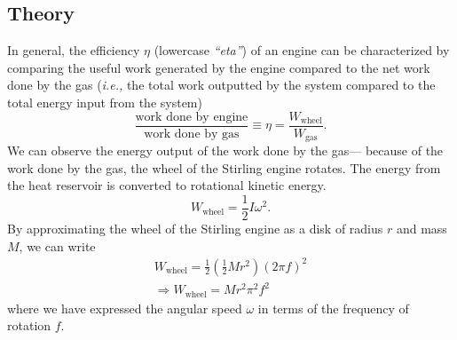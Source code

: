 \documentclass{article}
\begin{document}
\subsection{Theory}
In general, the efficiency $\eta$ (lowercase \textit{``eta''}) of an engine can be characterized by comparing the useful work generated by the engine compared to the net work done by the gas (\textit{i.e.,} the total work outputted by the system compared to the total energy input from the system)
\begin{equation*}
    \frac{\text{work done by engine}}{\text{work done by gas}}\equiv\eta = \frac{W_\mathrm{wheel}}{W_\mathrm{gas}}.
\end{equation*}
We can observe the energy output of the work done by the gas--- because of the work done by the gas, the wheel of the Stirling engine rotates. The energy from the heat reservoir is converted to rotational kinetic energy.
\begin{equation}
    W_\mathrm{wheel} = \frac{1}{2} I \omega^2.
\end{equation}
By approximating the wheel of the Stirling engine as a disk of radius $r$ and mass $M$, we can write
\begin{gather}
     W_\mathrm{wheel} = \frac{1}{2} \left(\frac{1}{2} M r^2 \right) (2\pi f)^2\\
     \Rightarrow  W_\mathrm{wheel} = M r^2 \pi^2 f^2
     \label{eq:work-wheel}
\end{gather}
where we have expressed the angular speed $\omega$ in terms of the frequency of rotation $f$.
\end{document}
